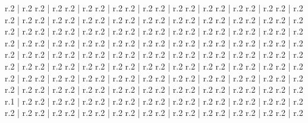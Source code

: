       r.2
    |
      r.2
      r.2
    |
      r.2
      r.2
    |
      r.2
      r.2
    |
      r.2
      r.2
    |
      r.2
      r.2
    |
      r.2
      r.2
    |
      r.2
      r.2
    |
      r.2
      r.2
    |
      r.2
      r.2
    |
      r.2
      r.2
    |
      r.2
      r.2
    |
      r.2
      r.2
    |
      r.2
      r.2
    |
      r.2
      r.2
    |
      r.2
      r.2
    |
      r.2
      r.2
    |
      r.2
      r.2
    |
      r.2
      r.2
    |
      r.2
      r.2
    |
      r.2
      r.2
    |
      r.2
      r.2
    |
      r.2
      r.2
    |
      r.2
      r.2
    |
      r.2
      r.2
    |
      r.2
      r.2
    |
      r.2
      r.2
    |
      r.2
      r.2
    |
      r.2
      r.2
    |
      r.2
      r.2
    |
      r.2
      r.2
    |
      r.2
      r.2
    |
      r.2
      r.2
    |
      r.2
      r.2
    |
      r.2
      r.2
    |
      r.2
      r.2
    |
      r.2
      r.2
    |
      r.2
      r.2
    |
      r.2
      r.2
    |
      r.2
      r.2
    |
      r.2
      r.2
    |
      r.2
      r.2
    |
      r.2
      r.2
    |
      r.2
      r.2
    |
      r.2
      r.2
    |
      r.2
      r.2
    |
      r.2
      r.2
    |
      r.2
      r.2
    |
      r.2
      r.2
    |
      r.2
      r.2
    |
      r.2
      r.2
    |
      r.2
      r.2
    |
      r.2
      r.2
    |
      r.2
      r.2
    |
      r.2
      r.2
    |
      r.2
      r.2
    |
      r.2
      r.2
    |
      r.2
      r.2
    |
      r.2
      r.2
    |
      r.2
      r.2
    |
      r.2
      r.2
    |
      r.2
      r.2
    |
      r.2
      r.2
    |
      r.2
      r.2
    |
      r.2
      r.2
    |
      r.2
      r.2
    |
      r.2
      r.2
    |
      r.2
      r.2
    |
      r.2
      r.2
    |
      r.2
      r.2
    |
      r.2
      r.2
    |
      r.2
      r.2
    |
      r.2
      r.2
    |
      r.2
      r.2
    |
      r.2
      r.2
    |
      r.2
      r.2
    |
      r.2
      r.2
    |
      r.2
      r.2
    |
      r.2
      r.2
    |
      r.2
      r.2
    |
      r.2
      r.1
    |
      r.2
      r.2
    |
      r.2
      r.2
    |
      r.2
      r.2
    |
      r.2
      r.2
    |
      r.2
      r.2
    |
      r.2
      r.2
    |
      r.2
      r.2
    |
      r.2
      r.2
    |
      r.2
      r.2
    |
      r.2
      r.2
    |
      r.2
      r.2
    |
      r.2
      r.2
    |
      r.2
      r.2
    |
      r.2
      r.2
    |
      r.2
      r.2
    |
      r.2
      r.2
    |
      r.2
      r.2
    |
      r.2
      r.2
    |
      r.2
      r.2
    |
      r.2

